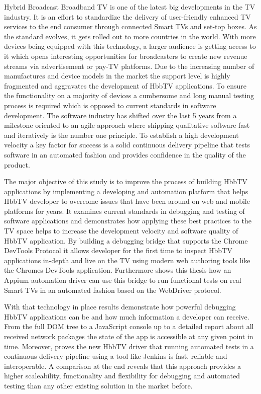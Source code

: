 Hybrid Broadcast Broadband TV is one of the latest big developments in the TV industry. It is
an effort to standardize the delivery of user-friendly enhanced TV services to the end consumer
through connected Smart TVs and set-top boxes. As the standard evolves, it gets rolled out to
more countries in the world. With more devices being equipped with this technology, a larger
audience is getting access to it which opens interesting opportunities for broadcasters to
create new revenue streams via advertisement or pay-TV platforms. Due to the increasing number
of manufactures and device models in the market the support level is highly fragmented and
aggravates the development of HbbTV applications. To ensure the functionality on a majority of
devices a cumbersome and long manual testing process is required which is opposed to current
standards in software development. The software industry has shifted over the last 5 years
from a milestone oriented to an agile approach where shipping qualitative software fast and
iteratively is the number one principle. To establish a high development velocity a key
factor for success is a solid continuous delivery pipeline that tests software in an automated
fashion and provides confidence in the quality of the product.

The major objective of this study is to improve the process of building HbbTV applications
by implementing a developing and automation platform that helps HbbTV developer to overcome
issues that have been around on web and mobile platforms for years. It examines current
standards in debugging and testing of software applications and demonstrates how applying
these best practices to the TV space helps to increase the development velocity and software
quality of HbbTV application. By building a debugging bridge that supports the Chrome DevTools
Protocol it allows developer for the first time to inspect HbbTV applications in-depth and live
on the TV using modern web authoring tools like the Chromes DevTools application. Furthermore
shows this thesis how an Appium automation driver can use this bridge to run functional tests
on real Smart TVs in an automated fashion based on the WebDriver protocol.

With that technology in place results demonstrate how powerful debugging HbbTV applications
can be and how much information a developer can receive. From the full DOM tree to a JavaScript
console up to a detailed report about all received network packages the state of the app is
accessible at any given point in time. Moreover, proves the new HbbTV driver that running
automated tests in a continuous delivery pipeline using a tool like Jenkins is fast, reliable
and interoperable. A comparison at the end reveals that this approach provides a higher
scaleability, functionality and flexibility for debugging and automated testing than any
other existing solution in the market before.
